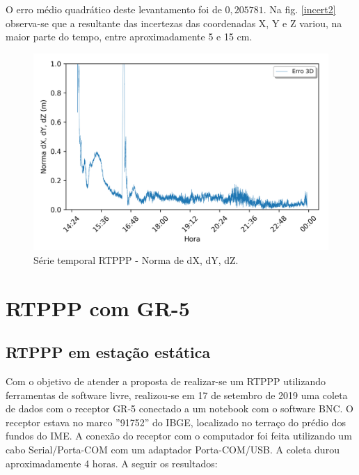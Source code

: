O erro médio quadrático deste levantamento foi de $0,205781$. Na fig. \ref{incert2} observa-se que a resultante das incertezas das coordenadas X, Y e Z variou, na maior parte do tempo, entre aproximadamente 5 e 15 cm. 

\begin{figure}[H]
\centering
\includegraphics[scale=0.9]{data/Graphics/POAL20650/POAL20650_graphic_result.png}
\caption{Série temporal RTPPP - Norma de dX, dY, dZ.}
\label{}
\end{figure}

\section{RTPPP com GR-5}
\subsection{RTPPP em estação estática}
\label{rtppp_estacao_estatica}
Com o objetivo de atender a proposta de realizar-se um RTPPP utilizando ferramentas de software livre, realizou-se em 17 de setembro de 2019 uma coleta de dados com o receptor GR-5 conectado a um notebook com o software BNC. O receptor estava no marco ''91752'' do IBGE, localizado no terraço do prédio dos fundos do IME. A conexão do receptor com o computador foi feita utilizando um cabo Serial/Porta-COM com um adaptador Porta-COM/USB. A coleta durou aproximadamente 4 horas. A seguir os resultados:


